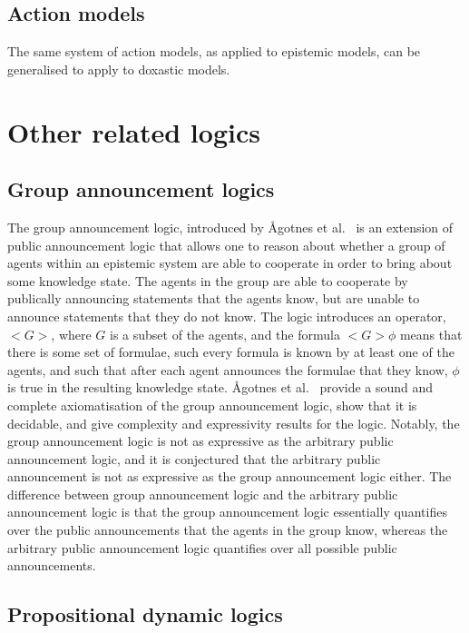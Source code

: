 \subsection{Action models}

The same system of action models, as applied to epistemic models, can be
generalised to apply to doxastic models.

\section{Other related logics}

\subsection{Group announcement logics}

The group announcement logic, introduced by {\AA}gotnes et
al.~\cite{agotnes2010group} is an extension of public announcement logic that
allows one to reason about whether a group of agents within an epistemic system
are able to cooperate in order to bring about some knowledge state. The agents
in the group are able to cooperate by publically announcing statements that the
agents know, but are unable to announce statements that they do not know. The
logic introduces an operator, $<G>$, where $G$ is a subset of the agents, and
the formula $<G> \phi$ means that there is some set of formulae, such every
formula is known by at least one of the agents, and such that after each agent
announces the formulae that they know, $\phi$ is true in the resulting
knowledge state. {\AA}gotnes et al.~\cite{agotnes2010group} provide a sound and
complete axiomatisation of the group announcement logic, show that it is
decidable, and give complexity and expressivity results for the logic. Notably,
the group announcement logic is not as expressive as the arbitrary public
announcement logic, and it is conjectured that the arbitrary public
announcement is not as expressive as the group announcement logic either.  The
difference between group announcement logic and the arbitrary public
announcement logic is that the group announcement logic essentially quantifies
over the public announcements that the agents in the group know, whereas the
arbitrary public announcement logic quantifies over all possible public
announcements.

\subsection{Propositional dynamic logics}

